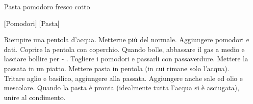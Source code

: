 \begin{recipe}{Pasta pomodoro fresco cotto}
    \begin{header}
        
        [Pomodori]
        [Pasta]
    \end{header}
    
    \begin{ingredients}[8]
    \end{ingredients}
    
    \begin{preparation}
        \step Riempire una pentola d'acqua. Metterne più del normale.
            Aggiungere pomodori e dati. Coprire la pentola con coperchio.
        \step Quando bolle, abbassare il gas a medio e lasciare bollire per  - .
        \step Togliere i pomodori e passarli con passaverdure. Mettere la passata in un piatto.
        \step Mettere pasta in pentola (in cui rimane solo l'acqua).
        \step Tritare aglio e basilico, aggiungere alla passata. Aggiungere anche sale ed olio e mescolare.
        \step Quando la pasta è pronta (idealmente tutta l'acqua si è asciugata), unire al condimento.
    \end{preparation}
\end{recipe}
